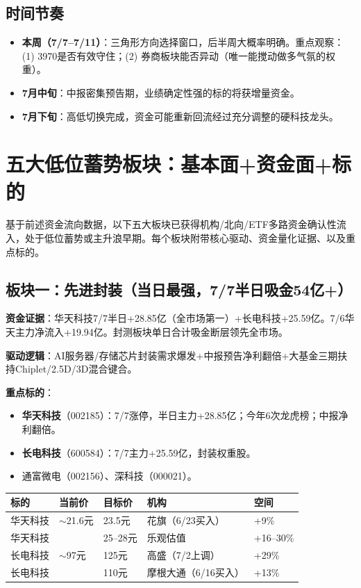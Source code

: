 \documentclass[a4paper,11pt,fontset=none]{ctexart}
\begin{document}
\subsection*{时间节奏}

\begin{itemize}
  \item \textbf{本周（7/7--7/11）}：三角形方向选择窗口，后半周大概率明确。重点观察：(1) 3970是否有效守住；(2) 券商板块能否异动（唯一能搅动做多气氛的权重）。
  \item \textbf{7月中旬}：中报密集预告期，业绩确定性强的标的将获增量资金。
  \item \textbf{7月下旬}：高低切换完成，资金可能重新回流经过充分调整的硬科技龙头。
\end{itemize}

\newpage
\section{五大低位蓄势板块：基本面+资金面+标的}

基于前述资金流向数据，以下五大板块已获得机构/北向/ETF多路资金确认性流入，处于低位蓄势或主升浪早期。每个板块附带核心驱动、资金量化证据、以及重点标的。

\subsection*{板块一：先进封装（当日最强，7/7半日吸金54亿+）}

\textbf{资金证据}：华天科技7/7半日+28.85亿（全市场第一）+长电科技+25.59亿。7/6华天主力净流入+19.94亿。封测板块单日合计吸金断层领先全市场。

\textbf{驱动逻辑}：AI服务器/存储芯片封装需求爆发+中报预告净利翻倍+大基金三期扶持Chiplet/2.5D/3D混合键合。

\textbf{重点标的}：
\begin{itemize}
  \item \textbf{华天科技}（002185）：7/7涨停，半日主力+28.85亿；今年6次龙虎榜；中报净利翻倍。
  \item \textbf{长电科技}（600584）：7/7主力+25.59亿，封装权重股。
  \item 通富微电（002156）、深科技（000021）。
\end{itemize}

\begin{tabularx}{\textwidth}{L{2.5cm}L{2cm}L{2cm}L{3cm}X}
\toprule
\textbf{标的} & \textbf{当前价} & \textbf{目标价} & \textbf{机构} & \textbf{空间} \\
\midrule
华天科技 & $\sim$21.6元 & 23.5元 & 花旗（6/23买入） & +9\% \\
华天科技 & & 25--28元 & 乐观估值 & +16--30\% \\
长电科技 & $\sim$97元 & 125元 & 高盛（7/2上调） & +29\% \\
长电科技 & & 110元 & 摩根大通（6/16买入） & +13\% \\
\bottomrule
\end{tabularx}
\end{document}
